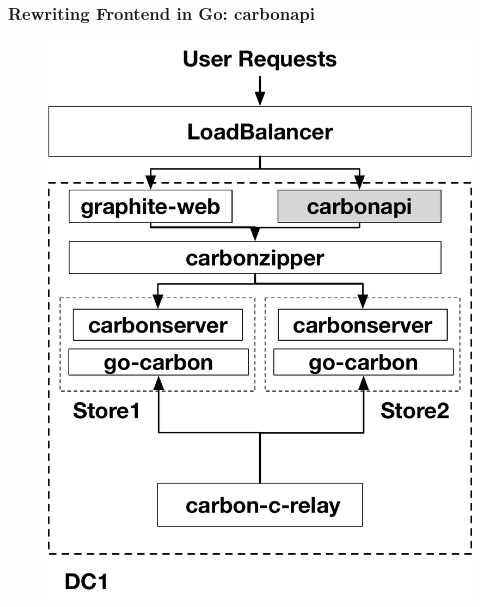 \documentclass[aspectratio=43, unicode, notheorems, xcolor={dvipsnames}]{beamer}
\begin{document}
\begin{frame}
	\frametitle{Rewriting Frontend in Go: carbonapi}
	\begin{figure}[h]
		\begin{center}
			\includegraphics[height=0.8\paperheight]{graphite-carbonapi}
		\end{center}
	\end{figure}
\end{frame}
\end{document}
